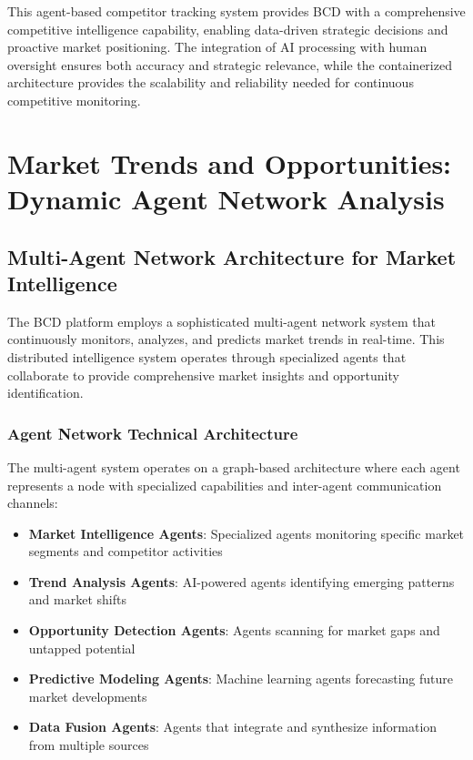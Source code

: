 This agent-based competitor tracking system provides BCD with a comprehensive competitive intelligence capability, enabling data-driven strategic decisions and proactive market positioning. The integration of AI processing with human oversight ensures both accuracy and strategic relevance, while the containerized architecture provides the scalability and reliability needed for continuous competitive monitoring.

\section{Market Trends and Opportunities: Dynamic Agent Network Analysis}

\subsection{Multi-Agent Network Architecture for Market Intelligence}

The BCD platform employs a sophisticated multi-agent network system that continuously monitors, analyzes, and predicts market trends in real-time. This distributed intelligence system operates through specialized agents that collaborate to provide comprehensive market insights and opportunity identification.

\subsubsection{Agent Network Technical Architecture}

The multi-agent system operates on a graph-based architecture where each agent represents a node with specialized capabilities and inter-agent communication channels:

\begin{itemize}
    \item \textbf{Market Intelligence Agents}: Specialized agents monitoring specific market segments and competitor activities
    \item \textbf{Trend Analysis Agents}: AI-powered agents identifying emerging patterns and market shifts
    \item \textbf{Opportunity Detection Agents}: Agents scanning for market gaps and untapped potential
    \item \textbf{Predictive Modeling Agents}: Machine learning agents forecasting future market developments
    \item \textbf{Data Fusion Agents}: Agents that integrate and synthesize information from multiple sources
\end{itemize}

